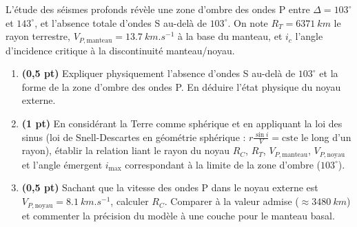 \documentclass[11pt]{article}
\begin{document}
\begin{exercice}
L'étude des séismes profonds révèle une zone d'ombre des ondes P entre $\Delta = 103^\circ$ et $143^\circ$, et l'absence totale d'ondes S au-delà de $103^\circ$. On note $R_T = \SI{6371}{km}$ le rayon terrestre, $V_{P,\text{manteau}} = \SI{13,7}{km.s^{-1}}$ à la base du manteau, et $i_c$ l'angle d'incidence critique à la discontinuité manteau/noyau.

\begin{enumerate}
    \item \textbf{(0,5 pt)} Expliquer physiquement l'absence d'ondes S au-delà de $103^\circ$ et la forme de la zone d'ombre des ondes P. En déduire l'état physique du noyau externe.
    \item \textbf{(1 pt)} En considérant la Terre comme sphérique et en appliquant la loi des sinus (loi de Snell-Descartes en géométrie sphérique : $r \frac{\sin i}{V} = \text{cste}$ le long d'un rayon), établir la relation liant le rayon du noyau $R_C$, $R_T$, $V_{P,\text{manteau}}$, $V_{P,\text{noyau}}$ et l'angle émergent $i_{\text{max}}$ correspondant à la limite de la zone d'ombre ($103^\circ$).
    \item \textbf{(0,5 pt)} Sachant que la vitesse des ondes P dans le noyau externe est $V_{P,\text{noyau}} = \SI{8,1}{km.s^{-1}}$, calculer $R_C$. Comparer à la valeur admise ($\approx \SI{3480}{km}$) et commenter la précision du modèle à une couche pour le manteau basal.
\end{enumerate}
\end{exercice}
\end{document}
